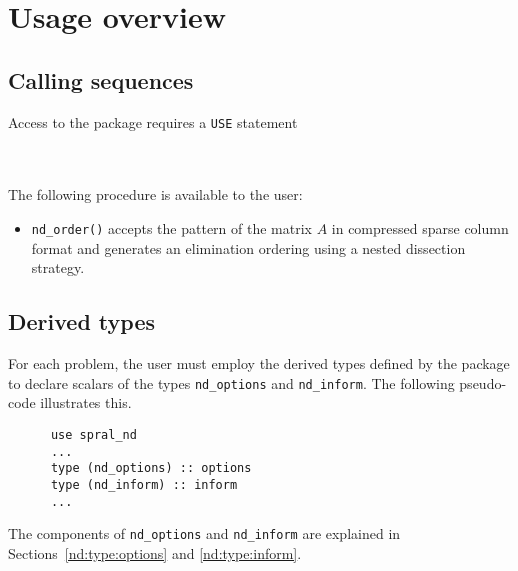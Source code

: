 
\section{Usage overview}

\subsection{Calling sequences}

Access to the package requires a {\tt USE} statement \\ \\
\indent\hspace{8mm}{\tt use spral\_nd} \\

\medskip

\noindent
The following procedure is available to the user:
\begin{itemize}
\item {\tt nd\_order()} accepts the  pattern of the 
matrix $A$ in compressed sparse column format and generates an elimination ordering 
using a nested dissection strategy.


\end{itemize}



\subsection{Derived types}

For each problem, the user must employ the derived types defined by the
package to declare scalars of the types
{\tt nd\_options} and {\tt nd\_inform}.
The following pseudo-code illustrates this.
\begin{verbatim}
      use spral_nd
      ...
      type (nd_options) :: options
      type (nd_inform) :: inform
      ...
\end{verbatim}
The components of {\tt nd\_options} and {\tt nd\_inform} are explained
in Sections~\ref{nd:type:options} and \ref{nd:type:inform}.


